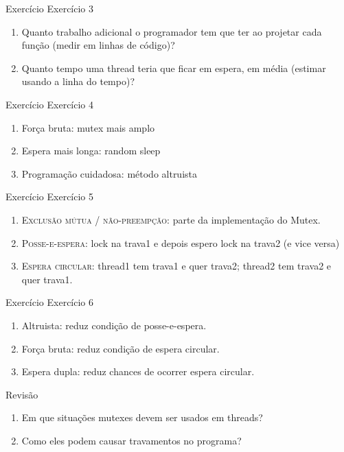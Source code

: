 \documentclass{beamer}
\begin{document}
\begin{frame}[fragile]{Exercício}
  \centering
  \Large
  Exercício 3
  \begin{enumerate}
    \item <2-> Quanto trabalho adicional o programador tem que ter
      ao projetar cada função (medir em linhas de código)?
    \item <2-> Quanto tempo uma thread teria que ficar em espera, em média
      (estimar usando a linha do tempo)?
  \end{enumerate}
\end{frame}


\begin{frame}[fragile]{Exercício}
  \centering
  \Large
  Exercício 4
  \begin{enumerate}
    \item <2-> Força bruta: mutex mais amplo
    \item <2-> Espera mais longa: random sleep
    \item <2-> Programação cuidadosa: método altruista
  \end{enumerate}
\end{frame}

\begin{frame}[fragile]{Exercício}
  \centering
  \Large
  Exercício 5
  \begin{enumerate}
    \item <2-> \textsc{Exclusão mútua / não-preempção}: parte da implementação
      do Mutex.
    \item <3-> \textsc{Posse-e-espera}: lock na trava1 e depois espero lock na
      trava2 (e vice versa)
    \item <4-> \textsc{Espera circular}: thread1 tem trava1 e quer trava2;
      thread2 tem trava2 e quer trava1.
  \end{enumerate}
\end{frame}


\begin{frame}[fragile]{Exercício}
  \centering
  \Large
  Exercício 6
  \begin{enumerate}
    \item <2-> Altruista: reduz condição de posse-e-espera.
    \item <3-> Força bruta: reduz condição de espera circular.
    \item <4-> Espera dupla: reduz chances de ocorrer espera circular.
  \end{enumerate}
\end{frame}


\begin{frame}[fragile]{Revisão}
  \centering
  \Large
  \begin{enumerate}
    \item Em que situações mutexes devem ser usados em threads?
    \item Como eles podem causar travamentos no programa?
  \end{enumerate}
\end{frame}
\end{document}
